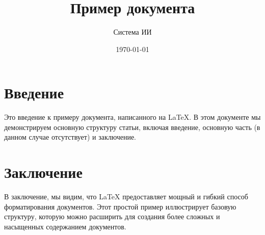 \documentclass{article}
\title{Пример документа}
\author{Система ИИ}
\date{\today}
\begin{document}
\maketitle

\section{Введение}
Это введение к примеру документа, написанного на LaTeX. В этом документе мы демонстрируем основную структуру статьи, включая введение, основную часть (в данном случае отсутствует) и заключение.

\section{Заключение}
В заключение, мы видим, что LaTeX предоставляет мощный и гибкий способ форматирования документов. Этот простой пример иллюстрирует базовую структуру, которую можно расширить для создания более сложных и насыщенных содержанием документов.
\end{document}
